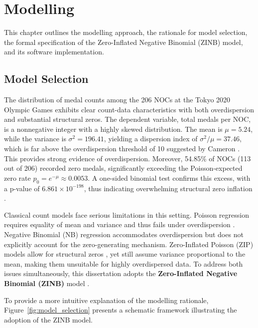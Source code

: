 \documentclass[11pt,twoside]{article}
\numberwithin{Theorem}{section}
\numberwithin{Definition}{section}
\numberwithin{Lemma}{section}
\numberwithin{Algorithm}{section}
\numberwithin{equation}{section}
\begin{document}
\clearpage

\section{Modelling} 
\label{sec:modelling}

This chapter outlines the modelling approach, the rationale for model selection, the formal specification of the Zero-Inflated Negative Binomial (ZINB) model, and its software implementation.

\subsection{Model Selection}
\label{subsec:model_selection}

The distribution of medal counts among the 206 NOCs at the Tokyo 2020 Olympic Games exhibits clear count-data characteristics with both overdispersion and substantial structural zeros. The dependent variable, total medals per NOC, is a nonnegative integer with a highly skewed distribution. The mean is $\mu=5.24$, while the variance is $\sigma^2=196.41$, yielding a dispersion index of $\sigma^2/\mu=37.46$, which is far above the overdispersion threshold of 10 suggested by Cameron \citep{cameron2013}. This provides strong evidence of overdispersion. Moreover, 54.85\% of NOCs (113 out of 206) recorded zero medals, significantly exceeding the Poisson-expected zero rate $p_0 = e^{-\mu} \approx 0.0053$. A one-sided binomial test confirms this excess, with a p-value of $6.861 \times 10^{-198}$, thus indicating overwhelming structural zero inflation \citep{lambert1992, ridout2001}.

Classical count models face serious limitations in this setting. Poisson regression requires equality of mean and variance and thus fails under overdispersion \citep{cameron2013}. Negative Binomial (NB) regression accommodates overdispersion \citep{greene1994} but does not explicitly account for the zero-generating mechanism. Zero-Inflated Poisson (ZIP) models allow for structural zeros \citep{lambert1992}, yet still assume variance proportional to the mean, making them unsuitable for highly overdispersed data. To address both issues simultaneously, this dissertation adopts the \textbf{Zero-Inflated Negative Binomial (ZINB)} model \citep{greene1994}.

To provide a more intuitive explanation of the modelling rationale, Figure~\ref{fig:model_selection} presents a schematic framework illustrating the adoption of the ZINB model. 
\end{document}

